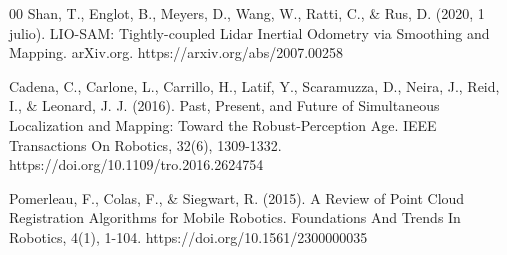 \documentclass[journal]{IEEEtran}
\begin{document}
\begin{thebibliography}{00}
     Shan, T., Englot, B., Meyers, D., Wang, W., Ratti, C., \& Rus, D. (2020, 1 julio). LIO-SAM: Tightly-coupled Lidar Inertial Odometry via Smoothing and Mapping. arXiv.org. https://arxiv.org/abs/2007.00258

     Cadena, C., Carlone, L., Carrillo, H., Latif, Y., Scaramuzza, D., Neira, J., Reid, I., \& Leonard, J. J. (2016). Past, Present, and Future of Simultaneous Localization and Mapping: Toward the Robust-Perception Age. IEEE Transactions On Robotics, 32(6), 1309-1332. https://doi.org/10.1109/tro.2016.2624754

     Pomerleau, F., Colas, F., \& Siegwart, R. (2015). A Review of Point Cloud Registration Algorithms for Mobile Robotics. Foundations And Trends In Robotics, 4(1), 1-104. https://doi.org/10.1561/2300000035

\end{thebibliography}
\end{document}
